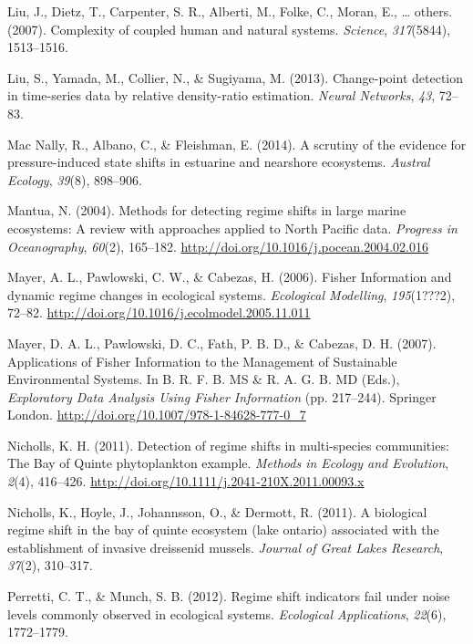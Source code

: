 \documentclass[12pt,twoside,openany]{reedthesis}
\begin{document}
\hypertarget{ref-liu_complexity_2007}{}
Liu, J., Dietz, T., Carpenter, S. R., Alberti, M., Folke, C., Moran, E.,
\ldots{} others. (2007). Complexity of coupled human and natural
systems. \emph{Science}, \emph{317}(5844), 1513--1516.

\hypertarget{ref-liu2013change}{}
Liu, S., Yamada, M., Collier, N., \& Sugiyama, M. (2013). Change-point
detection in time-series data by relative density-ratio estimation.
\emph{Neural Networks}, \emph{43}, 72--83.

\hypertarget{ref-mac2014scrutiny}{}
Mac Nally, R., Albano, C., \& Fleishman, E. (2014). A scrutiny of the
evidence for pressure-induced state shifts in estuarine and nearshore
ecosystems. \emph{Austral Ecology}, \emph{39}(8), 898--906.

\hypertarget{ref-mantua_methods_2004}{}
Mantua, N. (2004). Methods for detecting regime shifts in large marine
ecosystems: A review with approaches applied to North Pacific data.
\emph{Progress in Oceanography}, \emph{60}(2), 165--182.
\url{http://doi.org/10.1016/j.pocean.2004.02.016}

\hypertarget{ref-mayer_fisher_2006}{}
Mayer, A. L., Pawlowski, C. W., \& Cabezas, H. (2006). Fisher
Information and dynamic regime changes in ecological systems.
\emph{Ecological Modelling}, \emph{195}(1???2), 72--82.
\url{http://doi.org/10.1016/j.ecolmodel.2005.11.011}

\hypertarget{ref-mayer_applications_2007}{}
Mayer, D. A. L., Pawlowski, D. C., Fath, P. B. D., \& Cabezas, D. H.
(2007). Applications of Fisher Information to the Management of
Sustainable Environmental Systems. In B. R. F. B. MS \& R. A. G. B. MD
(Eds.), \emph{Exploratory Data Analysis Using Fisher Information} (pp.
217--244). Springer London.
\url{http://doi.org/10.1007/978-1-84628-777-0_7}

\hypertarget{ref-nicholls_detection_2011}{}
Nicholls, K. H. (2011). Detection of regime shifts in multi-species
communities: The Bay of Quinte phytoplankton example. \emph{Methods in
Ecology and Evolution}, \emph{2}(4), 416--426.
\url{http://doi.org/10.1111/j.2041-210X.2011.00093.x}

\hypertarget{ref-nicholls2011biological}{}
Nicholls, K., Hoyle, J., Johannsson, O., \& Dermott, R. (2011). A
biological regime shift in the bay of quinte ecosystem (lake ontario)
associated with the establishment of invasive dreissenid mussels.
\emph{Journal of Great Lakes Research}, \emph{37}(2), 310--317.

\hypertarget{ref-perretti2012regime}{}
Perretti, C. T., \& Munch, S. B. (2012). Regime shift indicators fail
under noise levels commonly observed in ecological systems.
\emph{Ecological Applications}, \emph{22}(6), 1772--1779.
\end{document}
